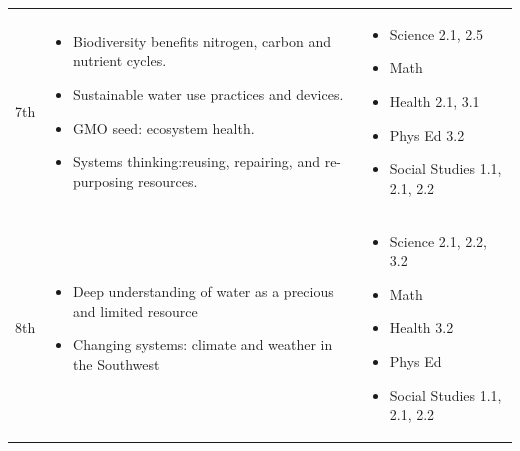 \documentclass[12pt,]{article}
\providecommand{\tightlist}{%
  \setlength{\itemsep}{0pt}\setlength{\parskip}{0pt}}
\begin{document}
\begin{longtable}[]{@{}lll@{}}
\begin{minipage}[t]{0.09\columnwidth}
7th\strut
\end{minipage} & \begin{minipage}[t]{0.44\columnwidth}\raggedright
\begin{itemize}
\tightlist
\item
  Biodiversity benefits nitrogen,
  carbon and nutrient cycles.
\item
  Sustainable water use practices
  and devices.
\item
  GMO seed: ecosystem health.
\item
  Systems thinking:reusing,
  repairing, and re-purposing
  resources.
\end{itemize}\strut
\end{minipage} & \begin{minipage}[t]{0.35\columnwidth}\raggedright
\begin{itemize}
\tightlist
\item
  Science 2.1, 2.5
\item
  Math
\item
  Health 2.1, 3.1
\item
  Phys Ed 3.2
\item
  Social Studies 1.1,
  2.1, 2.2
\end{itemize}\strut
\end{minipage}\tabularnewline
\begin{minipage}[t]{0.09\columnwidth}\raggedright
8th\strut
\end{minipage} & \begin{minipage}[t]{0.44\columnwidth}\raggedright
\begin{itemize}
\tightlist
\item
  Deep understanding of water as
  a precious and limited resource
\item
  Changing systems: climate and
  weather in the Southwest
\end{itemize}\strut
\end{minipage} & \begin{minipage}[t]{0.35\columnwidth}\raggedright
\begin{itemize}
\tightlist
\item
  Science 2.1, 2.2,
  3.2
\item
  Math
\item
  Health 3.2
\item
  Phys Ed
\item
  Social Studies 1.1,
  2.1, 2.2
\end{itemize}\strut
\end{minipage}\tabularnewline
\bottomrule
\end{longtable}
\end{document}
